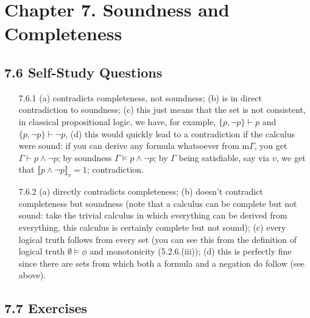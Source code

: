 \chapter{Chapter 7. Soundness and Completeness}

\section*{7.6 Self-Study Questions}

	\begin{enumerate}
	
		\item[7.6.1] (a) contradicts completeness, not soundness; (b) is in direct contradiction to soundness; (c) this just means that the set is not consistent, in classical propositional logic, we have, for example, $\{p,\neg p\}\vdash p$ and $\{p,\neg p\}\vdash \neg p$, (d) this would quickly lead to a contradiction if the calculus were sound: if you can derive any formula whatsoever from m$\Gamma$, you get $\Gamma\vdash p\land \neg p$; by soundness  $\Gamma\vDash p\land \neg p$; by $\Gamma$ being satisfiable, say via $v$, we get that $\llbracket p\land\neg p\rrbracket_v=1$; contradiction. 
		
		\item[7.6.2] (a) directly contradicts completeness; (b) doesn't contradict completeness but soundness (note that a calculus can be complete but not sound: take the trivial calculus in which everything can be derived from everything, this calculus is certainly complete but not sound); (c) every logical truth follows from every set (you can see this from the definition of logical truth $\emptyset\vDash\phi$ and monotonicity (5.2.6.(iii)); (d) this is perfectly fine since there are sets from which both a formula and a negation do follow (see above).
				
	\end{enumerate}

\section*{7.7 Exercises}

